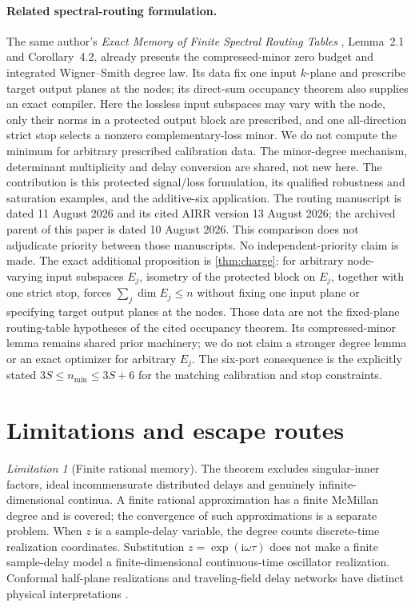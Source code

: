 \documentclass[11pt]{article}
\theoremstyle{definition}
\theoremstyle{remark}
\newtheorem{limitation}[theorem]{Limitation}
\begin{document}
\paragraph{Related spectral-routing formulation.}
The same author's \emph{Exact Memory of Finite Spectral Routing Tables}
\cite{ErikssonRouting2026}, Lemma~2.1 and Corollary~4.2, already presents
the compressed-minor zero budget and integrated Wigner--Smith degree law.
Its data fix one input $k$-plane and prescribe target output planes at
the nodes; its direct-sum occupancy theorem also supplies an exact compiler.
Here the lossless input subspaces may vary with the node, only their norms
in a protected output block are prescribed, and one all-direction strict
stop selects a nonzero complementary-loss minor. We do not compute the
minimum for arbitrary prescribed calibration data.
The minor-degree mechanism, determinant multiplicity and delay conversion
are shared, not new here. The contribution is this protected signal/loss
formulation, its qualified robustness and saturation examples, and the
additive-six application. The routing manuscript is dated 11 August 2026
and its cited AIRR version 13 August 2026; the archived parent of this
paper is dated 10 August 2026. This comparison does not adjudicate priority
between those manuscripts. No independent-priority claim is made.
The exact additional proposition is \cref{thm:charge}: for arbitrary
node-varying input subspaces $E_j$, isometry of the protected block on
$E_j$, together with one strict stop, forces $\sum_j\dim E_j\leq n$
without fixing one input plane or specifying target output planes at the
nodes. Those data are not the fixed-plane routing-table hypotheses of the
cited occupancy theorem. Its compressed-minor lemma remains shared prior
machinery; we do not claim a stronger degree lemma or an exact optimizer
for arbitrary $E_j$. The six-port consequence is the explicitly stated
$3S\leq n_{\min}\leq3S+6$ for the matching calibration and stop constraints.

\section{Limitations and escape routes}

\begin{limitation}[Finite rational memory]
The theorem excludes singular-inner factors, ideal incommensurate distributed
delays and genuinely infinite-dimensional continua.  A finite rational
approximation has a finite McMillan degree and is covered; the convergence of
such approximations is a separate problem. When $z$ is a sample-delay
variable, the degree counts discrete-time realization coordinates. Substitution
$z=\exp(\mathrm{i}\omega\tau)$ does not make a finite sample-delay model
a finite-dimensional continuous-time oscillator realization. Conformal
half-plane realizations and traveling-field delay networks have distinct
physical interpretations \cite{TabakMabuchi2016}.
\end{limitation}
\end{document}

